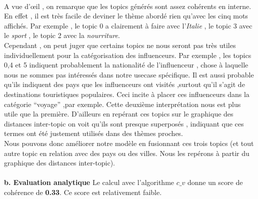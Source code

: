 \documentclass[12pt]{extarticle}
\begin{document}
\\A  vue d'œil , on remarque que les topics générés sont assez cohérents en interne. En effet , il est très facile de deviner le thème abordé  rien qu’avec les cinq mots affichés. Par exemple , le topic 0 a clairement à faire avec l’\textit{Italie} , le topic 3 avec le \textit{sport} , le topic 2 avec la \textit{nourriture}.\\
Cependant , on peut juger que certains topics ne nous seront pas très utiles individuellement pour  la catégorisation des influenceurs. Par exemple , les topics 0,4 et 5 indiquent probablement la nationalité de l’influenceur , chose à laquelle   nous ne sommes  pas  intéressés dans notre usecase spécifique. Il est aussi probable qu’ils indiquent des pays que les influenceurs ont visités ,surtout qu’il s’agit de destinations touristiques populaires. Ceci incite  à placer ces influenceurs dans la catégorie “voyage” ,par exemple. Cette deuxième interprétation nous est plus utile que la première. D’ailleurs en repérant ces topics sur le graphique des distances inter-topic on voit qu’ils sont presque superposés , indiquant que ces termes ont été justement  utilisés dans des thèmes proches.\\
Nous pouvons  donc améliorer notre modèle en fusionnant ces trois topics (et tout autre topic en relation avec des pays ou des villes. Nous les  repérons à partir  du graphique des distances inter-topic). \\ \\
\textbf{b. Evaluation analytique}
Le calcul avec l’algorithme $c\_v$ donne un score de cohérence de \textbf{0.33}. Ce score est relativement faible.
\end{document}
